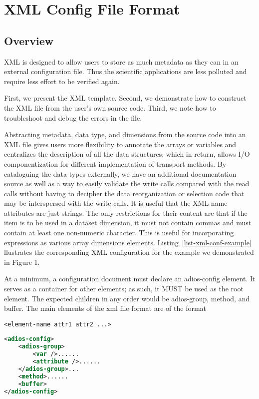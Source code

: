 \chapter{XML Config File Format}

\section{Overview} 
XML is designed to allow users to store as much metadata as they can in an external 
configuration file. Thus the scientific applications are less polluted and require 
less effort to be verified again.

First, we present the XML template. Second, we demonstrate how to construct the 
XML file from the user's own source code. Third, we note how to troubleshoot and 
debug the errors in the file.  

Abstracting metadata, data type, and dimensions from the source code into an XML 
file gives users more flexibility to annotate the arrays or variables and centralizes 
the description of all the data structures, which in return, allows I/O componentization 
for different implementation of transport methods. By cataloguing the data types 
externally, we have an additional documentation source as well as a way to easily 
validate the write calls compared with the read calls without having to decipher 
the data reorganization or selection code that may be interspersed with the write 
calls. It is useful that the XML name attributes are just strings. The only restrictions 
for their content are that if the item is to be used in a dataset dimension, it 
must not contain commas and must contain at least one non-numeric character. This 
is useful for incorporating expressions as various array dimensions elements. Listing~\ref{list-xml-conf-example} llustrates the corresponding XML configuration for the example we demonstrated 
in Figure 1. 

At a minimum, a configuration document must declare an adios-config element. It 
serves as a container for other elements; as such, it MUST be used as the root 
element. The expected children in any order would be adios-group, method, and buffer. 
The main elements of the xml file format are of the format 

\begin{lstlisting}
<element-name attr1 attr2 ...>
\end{lstlisting}

\begin{lstlisting}[language=XML, caption={Example XML configuration}, label=list-xml-conf-example]
<adios-config> 
	<adios-group>
		<var />......
		<attribute />...... 
	</adios-group>... 
	<method>...... 
	<buffer>
</adios-config>
\end{lstlisting}

